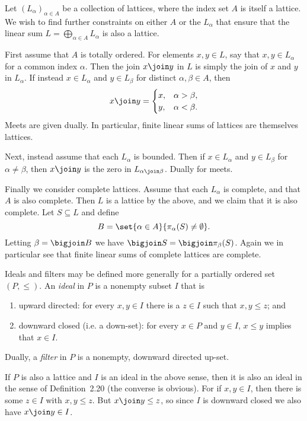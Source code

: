 \documentclass[article, a4paper, 11pt, oneside]{memoir}
\numberwithin{equation}{chapter}
\theoremstyle{nonumberplain}
\begin{document}
\begin{remarkbreak}
    Let $(L_\alpha)_{\alpha \in A}$ be a collection of lattices, where the index set $A$ is itself a lattice. We wish to find further constraints on either $A$ or the $L_\alpha$ that ensure that the linear sum $L = \bigoplus_{\alpha \in A} L_\alpha$ is also a lattice.
    
    First assume that $A$ is totally ordered. For elements $x,y \in L$, say that $x,y \in L_\alpha$ for a common index $\alpha$. Then the join $x \join y$ in $L$ is simply the join of $x$ and $y$ in $L_\alpha$. If instead $x \in L_\alpha$ and $y \in L_\beta$ for distinct $\alpha,\beta \in A$, then
    \begin{equation*}
        x \join y =
        \begin{cases}
            x, & \alpha > \beta, \\
            y, & \alpha < \beta.
        \end{cases}
    \end{equation*}
    Meets are given dually. In particular, finite linear sums of lattices are themselves lattices.

    Next, instead assume that each $L_\alpha$ is bounded. Then if $x \in L_\alpha$ and $y \in L_\beta$ for $\alpha \neq \beta$, then $x \join y$ is the zero in $L_{\alpha \join \beta}$. Dually for meets.

    Finally we consider complete lattices. Assume that each $L_\alpha$ is complete, and that $A$ is also complete. Then $L$ is a lattice by the above, and we claim that it is also complete. Let $S \subseteq L$ and define
    \begin{equation*}
        B
            = \set{\alpha \in A}{\pi_\alpha(S) \neq \emptyset}.
    \end{equation*}
    Letting $\beta = \bigjoin B$ we have $\bigjoin S = \bigjoin \pi_\beta(S)$. Again we in particular see that finite linear sums of complete lattices are complete.
\end{remarkbreak}


\begin{remarkbreak}
    Ideals and filters may be defined more generally for a partially ordered set $(P,\leq)$. An \emph{ideal} in $P$ is a nonempty subset $I$ that is
    \begin{enumerate}
        \item upward directed: for every $x,y \in I$ there is a $z \in I$ such that $x,y \leq z$; and
        \item downward closed (i.e. a down-set): for every $x \in P$ and $y \in I$, $x \leq y$ implies that $x \in I$.
    \end{enumerate}
    Dually, a \emph{filter} in $P$ is a nonempty, downward directed up-set.

    If $P$ is also a lattice and $I$ is an ideal in the above sense, then it is also an ideal in the sense of Definition~2.20 (the converse is obvious). For if $x,y \in I$, then there is some $z \in I$ with $x,y \leq z$. But $x \join y \leq z$, so since $I$ is downward closed we also have $x \join y \in I$.
\end{remarkbreak}
\end{document}
